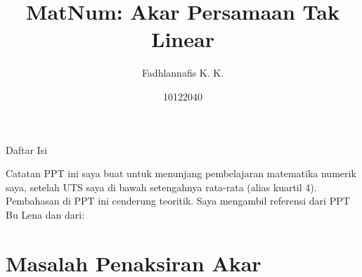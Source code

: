 \documentclass[xcolor={dvipsnames}, 9pt]{beamer}
\title{MatNum: Akar Persamaan Tak Linear}
\author{Fadhlannafis K. K.}
\date{10122040}
\begin{document}
	\begin{frame}[plain]
		\maketitle
	\end{frame}
	\begin{frame}{Daftar Isi}
		\tableofcontents
	\end{frame}
	\begin{frame}{Catatan}
		PPT ini saya buat untuk menunjang pembelajaran matematika numerik saya, setelah UTS saya di bawah setengahnya rata-rata (alias kuartil 4). \newline
		Pembahasan di PPT ini cenderung teoritik. Saya mengambil referensi dari PPT Bu Lena dan dari:
		\nocite{*}
		\printbibliography
	\end{frame}
	\section{Masalah Penaksiran Akar}
\end{document}
